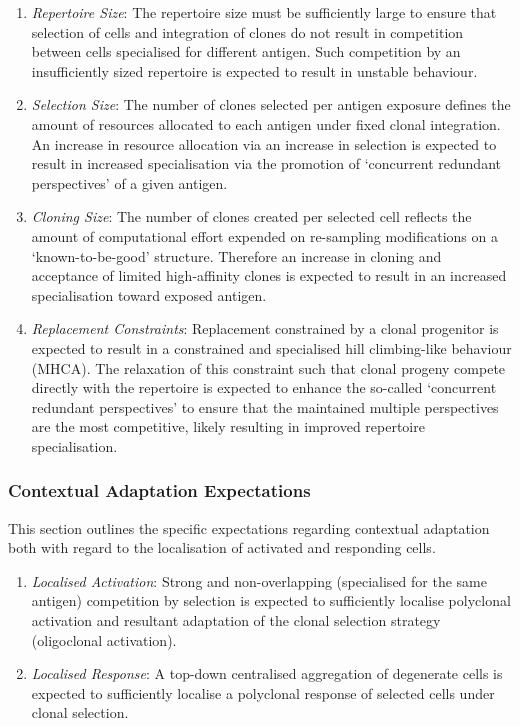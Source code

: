 \begin{enumerate}
	\item \emph{Repertoire Size}: The repertoire size must be sufficiently large to ensure that selection of cells and integration of clones do not result in competition between cells specialised for different antigen. Such competition by an insufficiently sized repertoire is expected to result in unstable behaviour. 
	\item \emph{Selection Size}: The number of clones selected per antigen exposure defines the amount of resources allocated to each antigen under fixed clonal integration. An increase in resource allocation via an increase in selection is expected to result in increased specialisation via the promotion of `concurrent redundant perspectives' of a given antigen. 
	\item \emph{Cloning Size}: The number of clones created per selected cell reflects the amount of computational effort expended on re-sampling modifications on a `known-to-be-good' structure. Therefore an increase in cloning and acceptance of limited high-affinity clones is expected to result in an increased specialisation toward exposed antigen. 
	\item \emph{Replacement Constraints}: Replacement constrained by a clonal progenitor is expected to result in a constrained and specialised hill climbing-like behaviour (MHCA). The relaxation of this constraint such that clonal progeny compete directly with the repertoire is expected to enhance the so-called `concurrent redundant perspectives' to ensure that the maintained multiple perspectives are the most competitive, likely resulting in improved repertoire specialisation.	
\end{enumerate}


%
%
\subsubsection{Contextual Adaptation Expectations}
This section outlines the specific expectations regarding contextual adaptation both with regard to the localisation of activated and responding cells.

\begin{enumerate}
	\item \emph{Localised Activation}: Strong and non-overlapping (specialised for the same antigen) competition by selection is expected to sufficiently localise polyclonal activation and resultant adaptation of the clonal selection strategy (oligoclonal activation).
	\item \emph{Localised Response}: A top-down centralised aggregation of degenerate cells is expected to sufficiently localise a polyclonal response of selected cells under clonal selection.
\end{enumerate}


